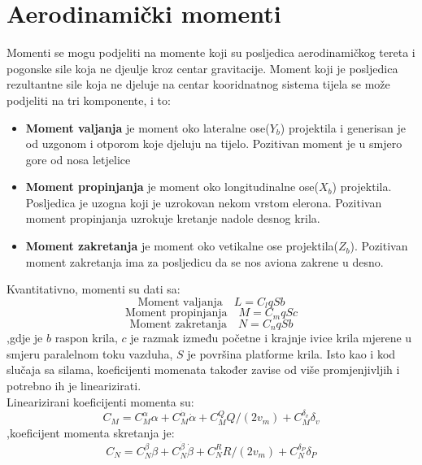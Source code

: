 \section{Aerodinamički momenti}
Momenti se mogu podjeliti na momente koji su posljedica aerodinamičkog tereta i 
pogonske sile koja ne djeulje kroz centar gravitacije. Moment koji je posljedica 
rezultantne sile koja ne djeluje na centar kooridnatnog sistema tijela se može 
podjeliti na tri komponente, i to:
\begin{itemize}
    \item \textbf{Moment valjanja} je moment oko lateralne ose($Y_b$) projektila i generisan 
    je od uzgonom i otporom koje djeluju na tijelo. Pozitivan moment je u smjero gore 
    od nosa letjelice 
    
    \item \textbf{Moment propinjanja} je moment oko longitudinalne ose($X_b$) projektila.
    Posljedica je uzogna koji je uzrokovan nekom vrstom elerona. Pozitivan moment propinjanja uzrokuje kretanje nadole 
    desnog krila.
    
    \item \textbf{Moment zakretanja} je moment oko vetikalne ose projektila($Z_b$). Pozitivan moment zakretanja 
    ima za posljedicu da se nos aviona zakrene u desno. 
\end{itemize}
Kvantitativno, momenti su dati sa:
\begin{equation}
    \text{Moment valjanja} \quad L=C_lqSb
    \label{eq:a1}
 \end{equation}
 \begin{equation}
     \text{Moment propinjanja} \quad M=C_mqSc
     \label{eq:a2}
 \end{equation}
 \begin{equation}
     \text{Moment zakretanja} \quad N=C_nqSb
     \label{eq:a3}
 \end{equation}
 ,gdje je $b$ raspon krila, $c$ je razmak između početne i krajnje ivice krila mjerene 
 u smjeru paralelnom toku vazduha, $S$ je površina platforme krila. 
 Isto kao i kod slučaja sa silama, koeficijenti momenata također zavise od više promjenjivljih 
 i potrebno ih je linearizirati. \\
 Linearizirani koeficijenti momenta  su:
 \begin{equation}
     C_M=C_M^{\alpha}\alpha +C_M^{\dot{\alpha}}\dot{\alpha} + C_M^Q Q/(2v_m)+C_M^{\delta _v}\delta _v
 \end{equation}
 ,koeficijent momenta skretanja je:
 \begin{equation}
     C_N=C_N^{\beta}\beta + C_N^{\dot{\beta}}\dot{\beta}+C_N^R R/(2v_m)+C_N^{\delta _P}\delta _P
 \end{equation} 
